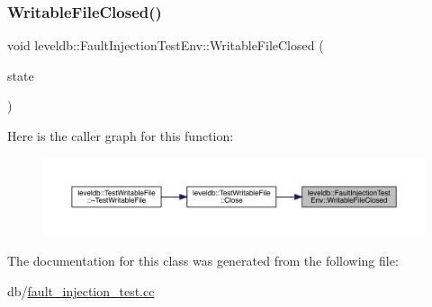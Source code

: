 \subsubsection{\texorpdfstring{WritableFileClosed()}{WritableFileClosed()}}
{\footnotesize\ttfamily void leveldb\+::\+Fault\+Injection\+Test\+Env\+::\+Writable\+File\+Closed (\begin{DoxyParamCaption}\item[{const File\+State \&}]{state }\end{DoxyParamCaption})}

Here is the caller graph for this function\+:
\nopagebreak
\begin{figure}[H]
\begin{center}
\leavevmode
\includegraphics[width=350pt]{classleveldb_1_1_fault_injection_test_env_accd10539b6cfa51468fe9cd6b85fd655_icgraph}
\end{center}
\end{figure}


The documentation for this class was generated from the following file\+:\begin{DoxyCompactItemize}
\item 
db/\mbox{\hyperlink{fault__injection__test_8cc}{fault\+\_\+injection\+\_\+test.\+cc}}\end{DoxyCompactItemize}
